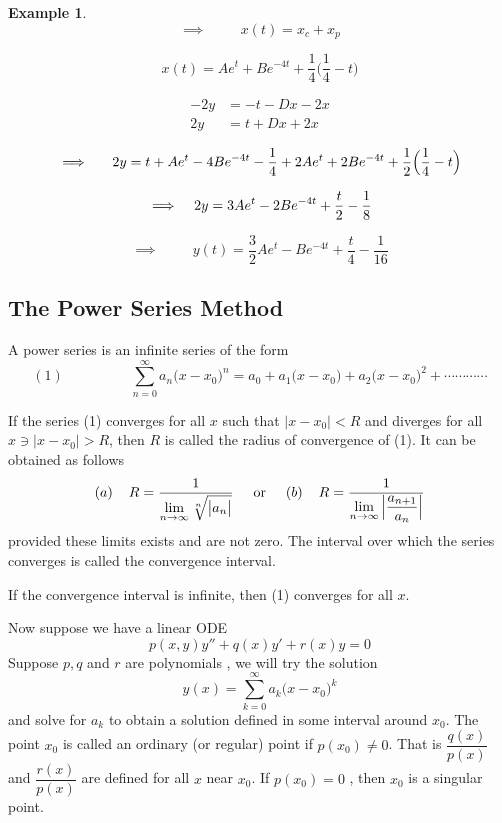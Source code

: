 \documentclass[11pt,a4paper]{article}
\theoremstyle{definition}
\newtheorem{exa}[thm]{Example}
\begin{document}
\begin{exa}
$$\implies \hspace{1cm} x(t) = x_c + x_p$$

$$x(t) = Ae^t + Be^{-4t} + \frac{1}{4}\Big(\frac{1}{4} - t\Big)$$

\begin{align*}
-2y & = -t -Dx -2x\\
2y & = t +Dx + 2x
\end{align*}

$$\implies \hspace{0.5cm} 2y = t + Ae^t -4Be^{-4t} - \frac{1}{4} + 2Ae^t + 2Be^{-4t} +\frac{1}{2}\Big(\frac{1}{4}-t\Big) $$

$$\implies \hspace{0.3cm} 2y = 3Ae^t - 2Be^{-4t} + \frac{t}{2} - \frac{1}{8}$$

$$\implies \hspace{1cm} y(t) = \frac{3}{2}Ae^t - B e^{-4t} + \frac{t}{4} - \frac{1}{16}$$
\end{exa}


{\color[wave]{485}\subsection{The Power Series Method}}
A power series is an infinite series of the form
$$(1)\hspace{2cm} \sum^{\infty}_{n = 0}  a_n \big(x - x_0\big)^n = a_0 + a_1\big(x -x_0\big) + a_2\big(x -x_0\big)^2 + \cdots\cdots\cdots\cdots$$

If the series (1) converges for all $x$ such that $\big|x - x_0\big| <R$ and diverges for all $x \ni \big|x -x_0\big| > R$, then $R$ is called the radius of convergence of (1). It can be obtained as follows
$$(a)\hspace{0.4cm} R = \frac{1}{\lim\limits_{n \rightarrow \infty} \sqrt[n]{\big|a_n\big|}}\hspace{0.5cm} \text{or}\hspace{0.5cm} (b)\hspace{0.4cm} R = \frac{1}{\lim\limits_{n \rightarrow \infty} \Big|\dfrac{a_{n+1}}{a_n}\Big|}$$
provided these limits exists and are not zero. The interval over which the series converges is called the convergence interval.


If the convergence interval is infinite, then (1) converges for all $x$.


Now suppose we have a linear ODE $$p(x,y) y'' + q(x)y' + r(x)y = 0$$
Suppose $p,q$ and $r$ are polynomials , we will try the solution $$y(x) = \sum^{\infty}_{k=0} a_k\big(x -x_0\big)^k$$ and solve for $a_k$ to obtain a solution defined in some interval around $x_0$. The point $x_0$ is called an ordinary (or regular) point if $p(x_0) \neq 0$. That is $\dfrac{q(x)}{p(x)}$ and $\dfrac{r(x)}{p(x)}$ are defined for all $x$ near $x_0$. If $p(x_0) = 0$ , then $x_0$ is a singular point.
\end{document}
